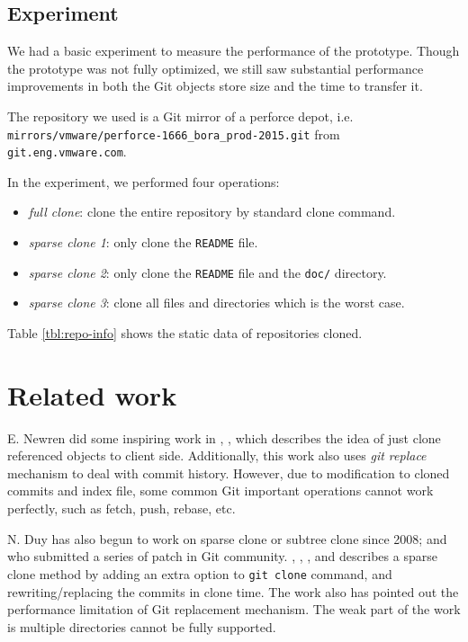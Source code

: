 \documentclass[preprint]{sigplanconf}
\begin{document}
\subsection{Experiment}
We had a basic experiment to measure the performance of the prototype.
Though the prototype was not fully optimized, we still saw substantial
performance improvements in both the Git objects store size and the time to
transfer it.

The repository we used is a Git mirror of a perforce depot, i.e.
\verb|mirrors/vmware/perforce-1666_bora_prod-2015.git| from
\verb|git.eng.vmware.com|.

In the experiment, we performed four operations:
\begin{itemize}
  \item \emph{full clone}: clone the entire repository by standard clone
    command.
  \item \emph{sparse clone 1}: only clone the \verb|README| file.
  \item \emph{sparse clone 2}: only clone the \verb|README| file and the
  \verb|doc/| directory.
  \item \emph{sparse clone 3}: clone all files and directories which is the
    worst case.
\end{itemize}
Table \ref{tbl:repo-info} shows the static data of repositories cloned.



\section{Related work}
E. Newren did some inspiring work in \cite{newren10-0}, \cite{newren10-1},
which describes the idea of just clone referenced objects to client side.
Additionally, this work also uses \emph{git replace} mechanism to deal with
commit history.
However, due to modification to cloned commits and index file, some common Git
important operations cannot work perfectly, such as fetch, push, rebase, etc.

N. Duy has also begun to work on sparse clone or subtree clone since 2008; and
who submitted a series of patch in Git community.
\cite{duy08}, \cite{duy10-1}, \cite{duy10-2}, and \cite{duy10-3} describes a
sparse clone method by adding an extra option to \verb|git clone| command, and
rewriting/replacing the commits in clone time.
The work also has pointed out the performance limitation of Git replacement
mechanism.
The weak part of the work is multiple directories cannot be fully supported.
\end{document}
